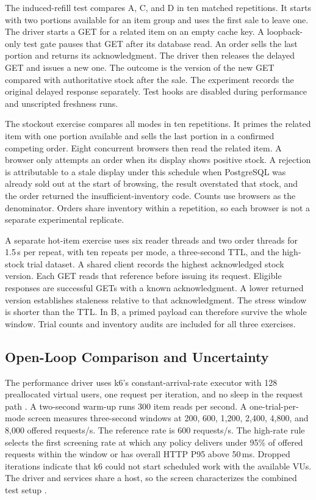 \documentclass[conference]{IEEEtran}
\begin{document}
The induced-refill test compares A, C, and D in ten matched repetitions. It starts with two portions available for an item group and uses the first sale to leave one. The driver starts a GET for a related item on an empty cache key. A loopback-only test gate pauses that GET after its database read. An order sells the last portion and returns its acknowledgment. The driver then releases the delayed GET and issues a new one. The outcome is the version of the new GET compared with authoritative stock after the sale. The experiment records the original delayed response separately. Test hooks are disabled during performance and unscripted freshness runs.

The stockout exercise compares all modes in ten repetitions. It primes the related item with one portion available and sells the last portion in a confirmed competing order. Eight concurrent browsers then read the related item. A browser only attempts an order when its display shows positive stock. A rejection is attributable to a stale display under this schedule when PostgreSQL was already sold out at the start of browsing, the result overstated that stock, and the order returned the insufficient-inventory code. Counts use browsers as the denominator. Orders share inventory within a repetition, so each browser is not a separate experimental replicate.

A separate hot-item exercise uses six reader threads and two order threads for 1.5\,s per repeat, with ten repeats per mode, a three-second TTL, and the high-stock trial dataset. A shared client records the highest acknowledged stock version. Each GET reads that reference before issuing its request. Eligible responses are successful GETs with a known acknowledgment. A lower returned version establishes staleness relative to that acknowledgment. The stress window is shorter than the TTL. In B, a primed payload can therefore survive the whole window. Trial counts and inventory audits are included for all three exercises.

\subsection{Open-Loop Comparison and Uncertainty}

The performance driver uses k6's constant-arrival-rate executor with 128 preallocated virtual users, one request per iteration, and no sleep in the request path \cite{k6arrival}. A two-second warm-up runs 300 item reads per second. A one-trial-per-mode screen measures three-second windows at 200, 600, 1{,}200, 2{,}400, 4{,}800, and 8{,}000 offered requests/s. The reference rate is 600 requests/s. The high-rate rule selects the first screening rate at which any policy delivers under 95\% of offered requests within the window or has overall HTTP P95 above 50\,ms. Dropped iterations indicate that k6 could not start scheduled work with the available VUs. The driver and services share a host, so the screen characterizes the combined test setup \cite{k6drops}.
\end{document}
